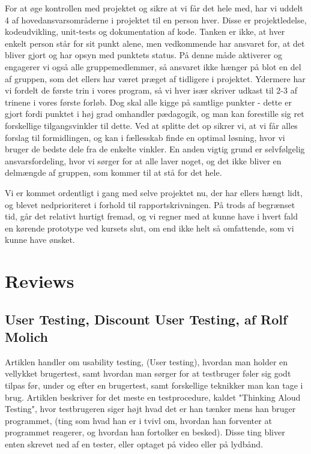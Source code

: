 \documentclass[10pt,a4paper,danish]{article}
\begin{document}
For at øge kontrollen med projektet og sikre at vi får det hele med, har vi uddelt 4 af hovedansvarsområderne i projektet til en person hver. Disse er projektledelse, kodeudvikling, unit-tests og dokumentation af kode. Tanken er ikke, at hver enkelt person står for sit punkt alene, men vedkommende har ansvaret for, at det bliver gjort og har opsyn med punktets status. På denne måde aktiverer og engagerer vi også alle gruppemedlemmer, så ansvaret ikke hænger på blot en del af gruppen, som det ellers har været præget af tidligere i projektet. Ydermere har vi fordelt de første trin i vores program, så vi hver især skriver udkast til 2-3 af trinene i vores første forløb. Dog skal alle kigge på samtlige punkter - dette er gjort fordi punktet i høj grad omhandler pædagogik, og man kan forestille sig ret forskellige tilgangsvinkler til dette. Ved at splitte det op sikrer vi, at vi får alles forslag til formidlingen, og kan i fællesskab finde en optimal løsning, hvor vi bruger de bedste dele fra de enkelte vinkler. En anden vigtig grund er selvfølgelig ansvarsfordeling, hvor vi sørger for at alle laver noget, og det ikke bliver en delmængde af gruppen, som kommer til at stå for det hele.  

Vi er kommet ordentligt i gang med selve projektet nu, der har ellers hængt lidt, og blevet nedprioriteret i forhold til rapportskrivningen. På trods af begrænset tid, går det relativt hurtigt fremad, og vi regner med at kunne have i hvert fald en kørende prototype ved kursets slut, om end ikke helt så omfattende, som vi kunne have ønsket. 


\section{Reviews}
\subsection{User Testing, Discount User Testing, af Rolf Molich}
Artiklen handler om usability testing, (User testing), hvordan man holder en vellykket brugertest, samt hvordan man sørger for at  testbruger føler sig godt tilpas før, under og efter en brugertest, samt forskellige teknikker man kan tage i brug. Artiklen beskriver for det meste en testprocedure, kaldet "Thinking Aloud Testing", hvor testbrugeren siger højt hvad det er han tænker mens han bruger programmet, (ting som hvad han er i tvivl om, hvordan han forventer at programmet reagerer, og hvordan han fortolker en besked). Disse ting bliver enten skrevet ned af en tester, eller optaget på video eller på lydbånd.
\end{document}

